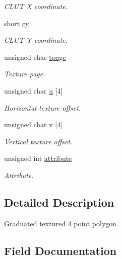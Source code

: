 \begin{DoxyCompactItemize}
\begin{DoxyCompactList}\small\item\em C\+L\+U\+T X coordinate. \end{DoxyCompactList}\item 
short \hyperlink{structGsGTPoly4_ab5b4698aa650f9ed928bda6a34568e4e}{cy}
\begin{DoxyCompactList}\small\item\em C\+L\+U\+T Y coordinate. \end{DoxyCompactList}\item 
unsigned char \hyperlink{structGsGTPoly4_a0fde3cb26a7c8c26a7c75861bfe36193}{tpage}
\begin{DoxyCompactList}\small\item\em Texture page. \end{DoxyCompactList}\item 
unsigned char \hyperlink{structGsGTPoly4_a7b5a20a8abed2cedd22cc8e0d6a2c3ea}{u} \mbox{[}4\mbox{]}
\begin{DoxyCompactList}\small\item\em Horizontal texture offset. \end{DoxyCompactList}\item 
unsigned char \hyperlink{structGsGTPoly4_a3cc6edf56ae16106f1abffbf56abced9}{v} \mbox{[}4\mbox{]}
\begin{DoxyCompactList}\small\item\em Vertical texture offset. \end{DoxyCompactList}\item 
unsigned int \hyperlink{structGsGTPoly4_afa584c5cbcc2623f56fb341ee4c4a5ba}{attribute}
\begin{DoxyCompactList}\small\item\em Attribute. \end{DoxyCompactList}\end{DoxyCompactItemize}


\subsection{Detailed Description}
Graduated textured 4 point polygon. 

\subsection{Field Documentation}
\hypertarget{structGsGTPoly4_afa584c5cbcc2623f56fb341ee4c4a5ba}{}
